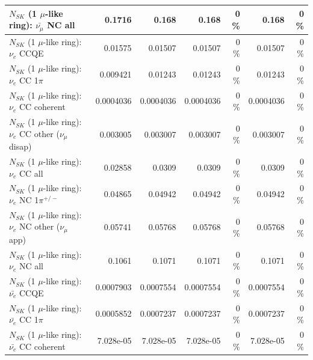 \begin{table}
\begin{tabular}{| l | r | r | r  r | r  r |}
                          $N_{SK}$ (1 $\mu$-like ring): $\bar{\nu_{\mu}}$ NC all &          0.1716 &           0.168 &           0.168 &        0 \%  &           0.168 &        0 \%  \\ 
\hline
\hline
\hline
                                      $N_{SK}$ (1 $\mu$-like ring): $\nu_e$ CCQE &         0.01575 &         0.01507 &         0.01507 &        0 \%  &         0.01507 &        0 \%  \\ 
                                 $N_{SK}$ (1 $\mu$-like ring): $\nu_e$ CC 1$\pi$ &        0.009421 &         0.01243 &         0.01243 &        0 \%  &         0.01243 &        0 \%  \\ 
                               $N_{SK}$ (1 $\mu$-like ring): $\nu_e$ CC coherent &       0.0004036 &       0.0004036 &       0.0004036 &        0 \%  &       0.0004036 &        0 \%  \\ 
                $N_{SK}$ (1 $\mu$-like ring): $\nu_e$ CC other ($\nu_\mu$ disap) &        0.003005 &        0.003007 &        0.003007 &        0 \%  &        0.003007 &        0 \%  \\ 
                                  $N_{SK}$ (1 $\mu$-like ring): $\nu_{e}$ CC all &         0.02858 &          0.0309 &          0.0309 &        0 \%  &          0.0309 &        0 \%  \\ 
\hline
                           $N_{SK}$ (1 $\mu$-like ring): $\nu_e$ NC 1$\pi^{+/-}$ &         0.04865 &         0.04942 &         0.04942 &        0 \%  &         0.04942 &        0 \%  \\ 
                  $N_{SK}$ (1 $\mu$-like ring): $\nu_e$ NC other ($\nu_\mu$ app) &         0.05741 &         0.05768 &         0.05768 &        0 \%  &         0.05768 &        0 \%  \\ 
                                  $N_{SK}$ (1 $\mu$-like ring): $\nu_{e}$ NC all &          0.1061 &          0.1071 &          0.1071 &        0 \%  &          0.1071 &        0 \%  \\ 
\hline
\hline
\hline
                                $N_{SK}$ (1 $\mu$-like ring): $\bar{\nu_e}$ CCQE &       0.0007903 &       0.0007554 &       0.0007554 &        0 \%  &       0.0007554 &        0 \%  \\ 
                           $N_{SK}$ (1 $\mu$-like ring): $\bar{\nu_e}$ CC 1$\pi$ &       0.0005852 &       0.0007237 &       0.0007237 &        0 \%  &       0.0007237 &        0 \%  \\ 
                         $N_{SK}$ (1 $\mu$-like ring): $\bar{\nu_e}$ CC coherent &       7.028e-05 &       7.028e-05 &       7.028e-05 &        0 \%  &       7.028e-05 &        0 \%  \\ 

\end{tabular}
\end{table}
